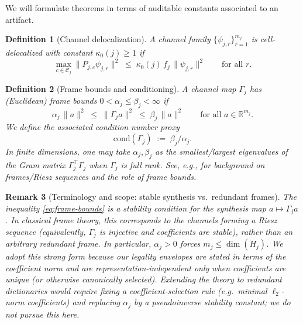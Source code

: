 \documentclass[11pt]{article}
\newtheorem{definition}{Definition}[section]
\newtheorem{remark}[definition]{Remark}
\begin{document}
We will formulate theorems in terms of auditable constants associated to an artifact.

\begin{definition}[Channel delocalization]\label{def:deloc}
A channel family $\{\psi_{j,r}\}_{r=1}^{m_j}$ is \emph{cell-delocalized} with constant $\kappa_0(j)\ge 1$ if
\begin{equation}\label{eq:deloc-hyp}
\max_{c\in\mathcal{C}_j}\|P_{j,c}\psi_{j,r}\|^2
\;\le\;
\kappa_0(j)\, f_j\,\|\psi_{j,r}\|^2
\qquad
\text{for all } r.
\end{equation}
\end{definition}

\begin{definition}[Frame bounds and conditioning]\label{def:frame-bounds}
A channel map $\Gamma_j$ has (Euclidean) frame bounds $0<\alpha_j\le \beta_j<\infty$ if
\begin{equation}\label{eq:frame-bounds}
\alpha_j\,\|a\|^2 \;\le\; \|\Gamma_j a\|^2 \;\le\; \beta_j\,\|a\|^2
\qquad
\text{for all } a\in\mathbb{R}^{m_j}.
\end{equation}
We define the associated condition number proxy
\begin{equation}\label{eq:cond-def}
\mathrm{cond}(\Gamma_j) \;:=\; \beta_j/\alpha_j.
\end{equation}
In finite dimensions, one may take $\alpha_j,\beta_j$ as the smallest/largest eigenvalues of the Gram matrix $\Gamma_j^\top\Gamma_j$ when $\Gamma_j$ is full rank.
See, e.g., \cite{Christensen2016Frames,DuffinSchaeffer1952Nonharmonic} for background on frames/Riesz sequences and the role of frame bounds.
\end{definition}

\begin{remark}[Terminology and scope: stable synthesis vs.\ redundant frames]\label{rem:stable-synthesis}
The inequality \eqref{eq:frame-bounds} is a stability condition for the \emph{synthesis} map $a\mapsto \Gamma_j a$.
In classical frame theory, this corresponds to the channels forming a \emph{Riesz sequence} (equivalently, $\Gamma_j$ is injective and coefficients are stable), rather than an arbitrary redundant frame.
In particular, $\alpha_j>0$ forces $m_j\le \dim(H_j)$.
We adopt this strong form because our legality envelopes are stated in terms of the coefficient norm and are representation-independent only when coefficients are unique (or otherwise canonically selected).
Extending the theory to redundant dictionaries would require fixing a coefficient-selection rule (e.g.\ minimal $\ell_2$-norm coefficients) and replacing $\alpha_j$ by a pseudoinverse stability constant; we do not pursue this here.
\end{remark}
\end{document}
